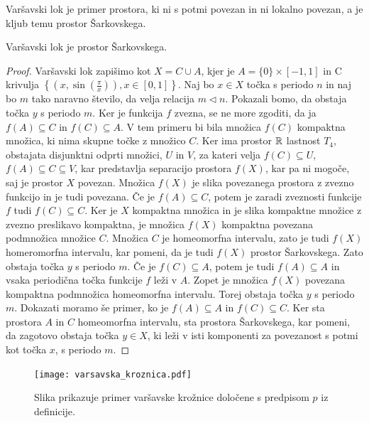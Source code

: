 \documentclass[../TG_magistrsko_delo_sections.tex]{subfiles}
\begin{document}
Varšavski lok je primer prostora, ki ni s potmi povezan in ni lokalno povezan, a je kljub temu prostor Šarkovskega.


\begin{trditev}
Varšavski lok je prostor Šarkovskega.
\end{trditev}
\begin{proof}
Varšavski lok zapišimo kot $X = C \cup A$, kjer je $A= \{0\} \times [-1, 1]$ in C krivulja $\left\{\left(x, \sin\left(\frac{\pi}{x}\right)\right), x\in [0, 1]\right\}$. Naj bo $x \in X$ točka s periodo $n$ in naj bo $m$ tako naravno število, da velja relacija $m \triangleleft n$. Pokazali bomo, da obstaja točka $y$ s periodo $m$. Ker je funkcija $f$ zvezna, se ne more zgoditi, da ja $f(A) \subseteq C$ in $f(C) \subseteq A$. V tem primeru bi bila množica $f(C)$ kompaktna množica, ki nima skupne točke z množico $C$. Ker ima prostor $\mathbb R$ lastnost $T_4$, obstajata disjunktni odprti množici, $U$ in $V$, za kateri velja $f(C) \subseteq U$, $f(A) \subseteq C \subseteq V$, kar predstavlja separacijo prostora $f(X)$, kar pa ni mogoče, saj je prostor $X$ povezan. Množica $f(X)$ je slika povezanega prostora z zvezno funkcijo in je tudi povezana. Če je $f(A) \subseteq C$, potem je zaradi zveznosti funkcije $f$ tudi $f(C) \subseteq C$. Ker je $X$ kompaktna množica in je slika kompaktne množice z zvezno preslikavo kompaktna, je množica $f(X)$ kompaktna povezana podmnožica množice $C$. Množica $C$ je homeomorfna intervalu, zato je tudi $f(X)$ homeromorfna intervalu, kar pomeni, da je tudi $f(X)$ prostor Šarkovskega. Zato obstaja točka $y$ s periodo $m$. Če je $f (C) \subseteq A $, potem je tudi $f (A) \subseteq A $ in vsaka periodična točka funkcije $f$ leži v $A$.  Zopet je množica $f(X)$ povezana kompaktna podmnožica homeomorfna intervalu. Torej obstaja točka $y$ s periodo $m$. 
Dokazati moramo še primer, ko je $f (A) \subseteq A $ in $f (C) \subseteq C $. Ker sta prostora $A$ in $C$ homeomorfna intervalu, sta prostora Šarkovskega, kar pomeni, da zagotovo obstaja točka $y \in X$, ki leži v isti komponenti za povezanost s potmi kot točka $x$, s periodo $m$.
\end{proof}



\begin{figure}[h]
  \centering
  \texttt{[image: varsavska\_kroznica.pdf]}
  \caption[Varšavska krožnica]{Slika prikazuje primer varšavske krožnice določene s predpisom $p$ iz definicije.}
  \label{fig:varšavski}
\end{figure}
\end{document}
